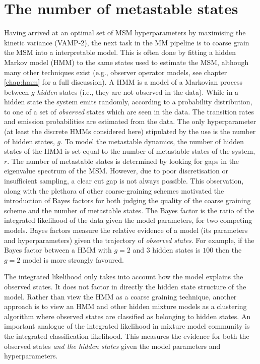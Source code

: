 \section{The number of metastable states}
Having arrived at an optimal set of MSM hyperparameters by maximising the kinetic variance (VAMP-2), the next task in the MM pipeline is to coarse grain the MSM into a interpretable model. This is often done by fitting a hidden Markov model (HMM) to the same states used to estimate the MSM\cite{noeMarkovModelsMolecular2019b}, although many other techniques exist (e.g., observer operator models\cite{wuProjectedMetastableMarkov2015}, see chapter \ref{chap:hmm} for a full discussion). A HMM is a model of a Markovian process between $g$ \emph{hidden} states (i.e., they are not observed in the data). While in a hidden state the system emits randomly, according to a probability distribution, to one of a set of \emph{observed} states which are seen in the data. The transition rates and emission probabilities are estimated from the data.  The only hyperparameter (at least the discrete HMMs considered here) stipulated by the use is the number of hidden states, $g$. To model the metastable dynamics, the number of hidden states of the HMM is set equal to the number of metastable states of the system, $r$\cite{noeProjectedHiddenMarkov2013a}. The number of metastable states is determined by looking for gaps in the eigenvalue spectrum of the MSM\cite{prinzMarkovModelsMolecular2011,noeProjectedHiddenMarkov2013a}. However, due to poor discretisation or insufficient sampling, a clear cut gap is not always possible\cite{bowmanQuantitativeComparisonAlternative2013}. This observation, along with the plethora of other coarse-graining schemes motivated the introduction of Bayes factors\cite{kassBayesFactors1995} for both judging the quality of the coarse graining scheme and the number of metastable states\cite{bacalladoBayesianComparisonMarkov2009a}. The Bayes factor is the ratio of the integrated likelihood of the data given the model parameters\cite{kassBayesFactors1995}, for two competing models. Bayes factors measure the relative evidence of a model (its parameters and hyperparameters) given the trajectory of \emph{observed states}. For example, if the Bayes factor between a HMM with $g=2$ and  $3$ hidden states is $100$ then the $g=2$ model is more strongly favoured. 

The integrated likelihood only takes into account how the model explains the observed states\cite{biernackiAssessingMixtureModel2000a,mclachlanFiniteMixtureModels2000}. It does not factor in directly the hidden state structure of the model. Rather than view the HMM as a coarse graining technique, another approach is to view an HMM and other hidden mixture models as a clustering algorithm\cite{mclachlanFiniteMixtureModels2000} where observed states are classified as belonging to hidden states. An important analogue of the integrated likelihood in mixture model community is the integrated classification likelihood\cite{mclachlanFiniteMixtureModels2000}. This measures the evidence for  both the observed states \emph{and the hidden states} given the model parameters and hyperparameters. 

